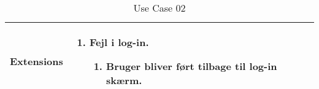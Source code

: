 \begin{table}[H]
\begin{tabular}{|l|p{10cm}|}
Extensions							& 

									\renewcommand{\labelenumi}{\Roman{enumi}:}
									\renewcommand{\labelenumii}{\alph{enumii})}
									\begin{enumerate}[topsep=0.0cm,leftmargin=0.5cm]
										\item Fejl i log-in.
											\begin{enumerate}[topsep=0cm, leftmargin=1cm]
												\item Bruger bliver ført tilbage til log-in skærm.
											\end{enumerate}
									\end{enumerate} \\\hline	

\end{tabular}
\caption{Use Case 02}
\label{tab:UC02}
\end{table}